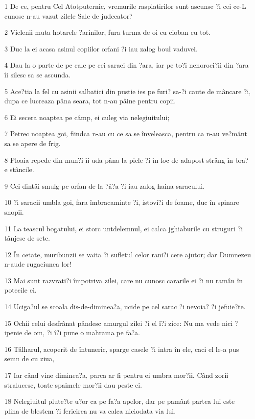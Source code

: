 \par 1 De ce, pentru Cel Atotputernic, vremurile rasplatirilor sunt ascunse ?i cei ce-L cunosc n-au vazut zilele Sale de judecator?
\par 2 Viclenii muta hotarele ?arinilor, fura turma de oi cu cioban cu tot.
\par 3 Duc la ei acasa asinul copiilor orfani ?i iau zalog boul vaduvei.
\par 4 Dau la o parte de pe cale pe cei saraci din ?ara, iar pe to?i nenoroci?ii din ?ara îi silesc sa se ascunda.
\par 5 Ace?tia la fel cu asinii salbatici din pustie ies pe furi? sa-?i caute de mâncare ?i, dupa ce lucreaza pâna seara, tot n-au pâine pentru copii.
\par 6 Ei secera noaptea pe câmp, ei culeg via nelegiuitului;
\par 7 Petrec noaptea goi, fiindca n-au cu ce sa se înveleasca, pentru ca n-au ve?mânt sa se apere de frig.
\par 8 Ploaia repede din mun?i îi uda pâna la piele ?i în loc de adapost strâng în bra?e stâncile.
\par 9 Cei dintâi smulg pe orfan de la ?â?a ?i iau zalog haina saracului.
\par 10 ?i saracii umbla goi, fara îmbracaminte ?i, istovi?i de foame, duc în spinare snopii.
\par 11 La teascul bogatului, ei storc untdelemnul, ei calca jghiaburile cu struguri ?i tânjesc de sete.
\par 12 În cetate, muribunzii se vaita ?i sufletul celor rani?i cere ajutor; dar Dumnezeu n-aude rugaciunea lor!
\par 13 Mai sunt razvrati?i împotriva zilei, care nu cunosc cararile ei ?i nu ramân în potecile ei.
\par 14 Uciga?ul se scoala dis-de-diminea?a, ucide pe cel sarac ?i nevoia? ?i jefuie?te.
\par 15 Ochii celui desfrânat pândesc amurgul zilei ?i el î?i zice: Nu ma vede nici ?ipenie de om, ?i î?i pune o mahrama pe fa?a.
\par 16 Tâlharul, acoperit de întuneric, sparge casele ?i intra în ele, caci el le-a pus semn de cu ziua,
\par 17 Iar când vine diminea?a, parca ar fi pentru ei umbra mor?ii. Când zorii stralucesc, toate spaimele mor?ii dau peste ei.
\par 18 Nelegiuitul plute?te u?or ca pe fa?a apelor, dar pe pamânt partea lui este plina de blestem ?i fericirea nu va calca niciodata via lui.
